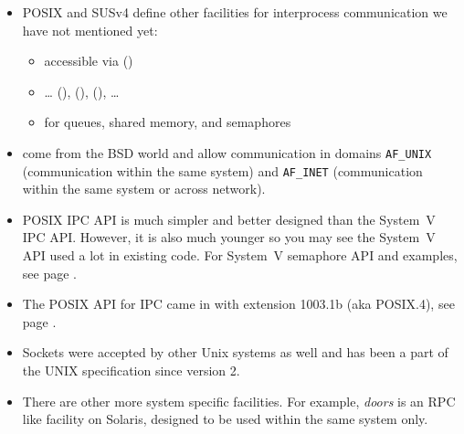 

\begin{slide}
\begin{itemize}
\item POSIX and SUSv4 define other facilities for interprocess communication we
have not mentioned yet:
    \begin{itemize}
    \item {} accessible via ()
    \item {} \dots{} (),
    (), (), \dots{} 
    \item {} for queues, shared memory, and semaphores
    \end{itemize}
\item {} come from the BSD world and allow communication in domains
\texttt{AF\_UNIX} (communication within the same system) and \texttt{AF\_INET}
(communication within the same system or across network).
\end{itemize}
\end{slide}

\begin{itemize}
\item POSIX IPC API is much simpler and better designed than the System~V IPC
API.  However, it is also much younger so you may see the System~V API used a
lot in existing code.  For System~V semaphore API and examples, see page
\pageref{SYSVSEM}.
\item The POSIX API for IPC came in with extension 1003.1b (aka POSIX.4), see
page \pageref{POSIX4}.
\item Sockets were accepted by other Unix systems as well and has been a part of
the UNIX specification since version 2.
\item There are other more system specific facilities.  For example,
\emph{doors} is an RPC like facility on Solaris, designed to be used within the
same system only.
\end{itemize}

\label{SYNCHRONIZATIONEND}

\endinput
